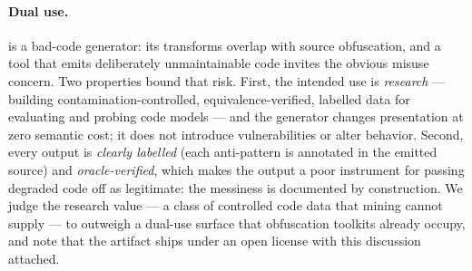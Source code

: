\paragraph{Dual use.} \tool{} is a bad-code generator: its transforms overlap
with source obfuscation, and a tool that emits deliberately unmaintainable code invites
the obvious misuse concern. Two properties bound that risk. First, the intended use is
\emph{research} --- building contamination-controlled, equivalence-verified, labelled data
for evaluating and probing code models --- and the generator changes presentation at zero
semantic cost; it does not introduce vulnerabilities or alter behavior. Second, every
output is \emph{clearly labelled} (each anti-pattern is annotated in
the emitted source) and \emph{oracle-verified}, which makes the output a poor instrument
for passing degraded code off as legitimate: the messiness is documented by construction.
We judge the research value --- a class of controlled code data that mining cannot
supply --- to outweigh a dual-use surface that obfuscation toolkits already occupy, and
note that the artifact ships under an open license with this discussion attached.
